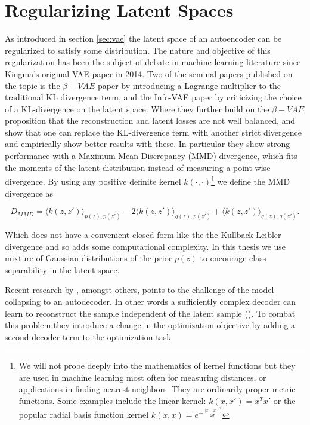 \section{Regularizing Latent Spaces}\label{sec:latent}

As introduced in section \ref{sec:vae} the latent space of an autoencoder can be regularized to satisfy some distribution. The nature and objective of this regularization has been the subject of debate in machine learning literature since Kingma's original VAE paper in 2014. Two of the seminal papers published on the topic is the $\beta-VAE$ paper by \citet{Higgins2017} introducing a Lagrange multiplier to the traditional KL divergence term, and the Info-VAE paper by \citet{Zhao} criticizing the choice of a KL-divergence on the latent space. Where they further build on the $\beta-VAE$ proposition that the reconstruction and latent losses are not well balanced, and show that one can replace the KL-divergence term with another strict divergence and empirically show better results with these. In particular they show strong performance with a Maximum-Mean Discrepancy (MMD) divergence, which fits the moments of the latent distribution instead of measuring a point-wise divergence. By using any positive definite kernel $k(\cdot, \cdot)$\footnote{We will not probe deeply into the mathematics of kernel functions but they are used in machine learning most often for measuring distances, or applications in finding nearest neighbors. They are ordinarily proper metric functions. Some examples include the linear kernel: $k(x, x') = x^Tx'$ or the popular radial basis function kernel $k(x, x)=e^{-\frac{||x - x'||^2}{2\sigma}}$}  we define the MMD divergence as  

\begin{equation}\label{eq:mmd}
D_{MMD} = \langle k(z, z')\rangle_{p(z), p(z')} - 2 \langle k(z, z')\rangle_{q(z), p(z')} + \langle k(z, z')\rangle_{q(z), q(z')}.
\end{equation}

\noindent Which does not have a convenient closed form like the the Kullback-Leibler divergence and so adds some computational complexity. In this thesis we use mixture of Gaussian distributions of the prior $p(z)$ to encourage class separability in the latent space.

Recent research by \citet{Seybold2019}, amongst others, points to the challenge of the model collapsing to an autodecoder. In other words a sufficiently complex decoder can learn to reconstruct the sample independent of the latent sample (\cite{Seybold2019}). To combat this problem they introduce a change in the optimization objective by adding a second decoder term to the optimization task


